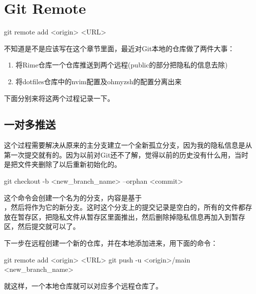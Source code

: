 \section{Git Remote}
\begin{shellcmd}
git remote add <origin> <URL>
\end{shellcmd}

不知道是不是应该写在这个章节里面，最近对Git本地的仓库做了两件大事：

\begin{enumerate}
	\item 将Rime仓库一个仓库推送到两个远程(public的部分把隐私的信息去除)
	\item 将dotfiles仓库中的nvim配置及ohmyzsh的配置分离出来
\end{enumerate}

下面分别来将这两个过程记录一下。

\subsection{一对多推送}
这个过程需要解决从原来的主分支建立一个全新孤立分支，因为我的隐私信息是从第一次提交就有的。因为以前对Git还不了解，觉得以前的历史没有什么用，当时是把文件夹删除了以后重新初始化的。
\begin{shellcmd}
	git checkout -b <new_branch_name> --orphan <commit>
\end{shellcmd}
这个命令会创建一个名为的分支，内容是基于\\，然后将作为它的新分支。这时这个分支上的提交记录是空白的，所有的文件都存放在暂存区，把隐私文件从暂存区里面推出，然后删除掉隐私信息再加入到暂存区，然后提交就可以了。

下一步在远程创建一个新的仓库，并在本地添加进来，用下面的命令：
\begin{shellcmd}
git remote add <origin> <URL>
git push -u <origin>/main <new_branch_name>
\end{shellcmd}
就这样，一个本地仓库就可以对应多个远程仓库了。
